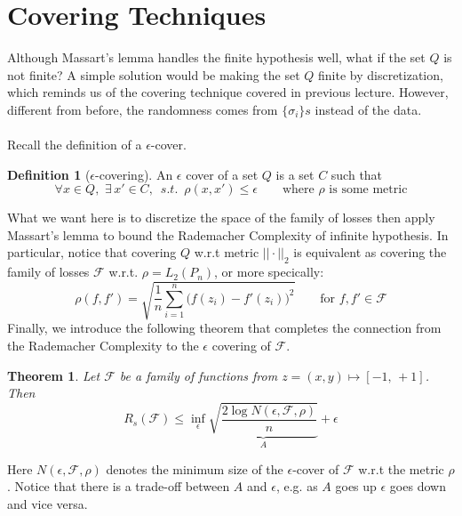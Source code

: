 \documentclass[11pt]{article}
\newtheorem{theorem}{Theorem}
\theoremstyle{definition}
\newtheorem{definition}{Definition}
\theoremstyle{remark}
\begin{document}
\section{Covering Techniques}
Although Massart's lemma handles the finite hypothesis well, what if the set $Q$ is not finite? A simple solution would be making the set $Q$ finite by discretization, which reminds us of the covering technique covered in previous lecture. However, different from before, the randomness comes from $\{\sigma_i\}s$ instead of the data.\\\\
Recall the definition of a $\epsilon$-cover.
\begin{definition}[$\epsilon$-covering]
An $\epsilon$ cover of a set $Q$ is a set $C$ such that 
\[\forall x \in Q,\,\, \exists\, x' \in C,\,\,\, s.t.\,\,\, \rho(x, x') \leq \epsilon \qquad \text{where $\rho$ is some metric}\]
\end{definition}
What we want here is to discretize the space of the family of losses then apply Massart's lemma to bound the Rademacher Complexity of infinite hypothesis. In particular, notice that covering $Q$ w.r.t metric $||\cdot||_2$ is equivalent as covering the family of losses $\mathcal{F}$ w.r.t. $\rho = L_2(P_n)$, or more specically:
\[\rho(f, f') = \sqrt{\frac{1}{n}\sum_{i=1}^n\big(f(z_i) - f'(z_i)\big)^2}\qquad \text{for }f, f' \in \mathcal{F}\]
Finally, we introduce the following theorem that completes the connection from the Rademacher Complexity to the $\epsilon$ covering of $\mathcal{F}$.
\begin{theorem}
Let $\mathcal{F}$ be a family of functions from $z = (x, y) \longmapsto [-1,\,+1]$. Then
\[R_s(\mathcal{F}) \leq \inf\limits_{\epsilon} \underbrace{\sqrt{\frac{2\log N(\epsilon, \mathcal{F}, \rho)}{n}}}_{A} + \epsilon\]
\end{theorem}
Here $N(\epsilon, \mathcal{F}, \rho)$ denotes the minimum size of the $\epsilon$-cover of $\mathcal{F}$ w.r.t the metric $\rho$. Notice that there is a trade-off between $A$ and $\epsilon$, e.g. as $A$ goes up $\epsilon$ goes down and vice versa.
\end{document}
